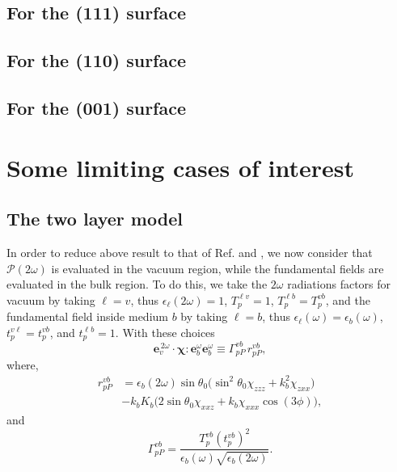 \subsection{For the (111) surface}


\subsection{For the (110) surface}


\subsection{For the (001) surface}




\section{Some limiting cases of interest}

\subsection{The two layer model}

In order to reduce above result to that of Ref. \cite{mizrahiJOSA88} and
\cite{sipePRB87}, we now consider that $\mathcal{P}(2\omega)$ is evaluated in
the vacuum region, while the fundamental fields are evaluated in the bulk
region. To do this, we take the $2\omega$ radiations factors for vacuum by
taking $\ell=v$, thus $\epsilon_{\ell}(2\omega)=1$, $T^{\ell v}_{p}=1$, $T^{\ell
b}_{p}=T^{vb}_{p}$, and the fundamental field inside medium $b$ by taking
$\ell=b$, thus $\epsilon_{\ell}(\omega)=\epsilon_{b}(\omega)$,
$t^{v\ell}_{p}=t^{vb}_{p}$, and $t^{\ell b}_{p}=1$. With these choices
\begin{equation*}\label{m800}
\mathbf{e}^{\,2\omega}_{v}\cdot\boldsymbol{\chi}:
\mathbf{e}^\omega_{b}\mathbf{e}^\omega_{b}
\equiv\Gamma^{vb}_{pP}\,r^{vb}_{pP}
,
\end{equation*}
where,
\begin{equation*}\label{m82}
\begin{split}
r^{vb}_{pP}
&= \epsilon_{b}(2\omega)\sin\theta_{0}
\Big(
\sin^2\theta_{0}\chi_{zzz} + k^{2}_{b}\chi_{zxx}
\Big)\\
&- k_{b}K_{b}
\Big(
2\sin\theta_{0}\chi_{xxz} + k_{b}\chi_{xxx}\cos(3\phi) 
\Big) 
,
\end{split}
\end{equation*}
and 
\begin{equation*}\label{m78}
\Gamma^{vb}_{pP}
= \frac{T^{v b}_{p}(t^{vb}_{p})^2}
       {\epsilon_{b}(\omega)\sqrt{\epsilon_{b}(2\omega)}}.
\end{equation*}


